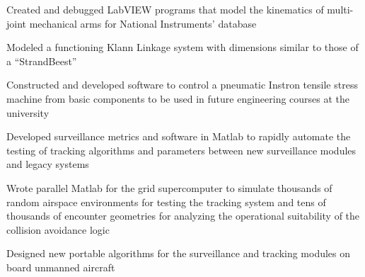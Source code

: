 \documentclass[letterpaper]{article}
\begin{document}
\begin{compactitem}
	\item Created and debugged LabVIEW programs that model the kinematics of multi-joint mechanical arms for National Instruments’ database\\
	\item Modeled a functioning Klann Linkage system with dimensions similar to those of a “StrandBeest”\\
	\item Constructed and developed software to control a pneumatic Instron tensile stress machine from basic components to be used in future engineering courses at the university
\end{compactitem}


\noindent{\Large\textbf {\\INDUSTRY}}

\begin{compactitem}
	\item Developed surveillance metrics and software in Matlab to rapidly automate the testing of tracking algorithms and parameters between new surveillance modules and legacy systems\\
	\item Wrote parallel Matlab for the grid supercomputer to simulate thousands of random airspace environments for testing the tracking system and tens of thousands of encounter geometries for analyzing the operational suitability of the collision avoidance logic\\
	\item 
	\item Designed new portable algorithms for the surveillance and tracking modules on board unmanned aircraft
\end{compactitem}
\end{document}
